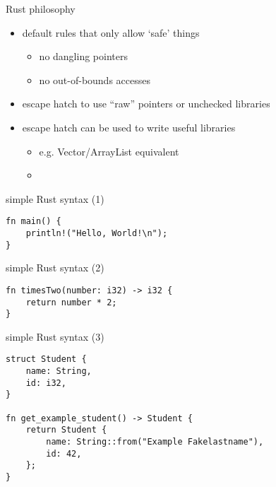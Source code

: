 \begin{frame}{Rust philosophy}
    \begin{itemize}
    \item default rules that only allow `safe' things
        \begin{itemize}
        \item no dangling pointers
        \item no out-of-bounds accesses
        \end{itemize}
    \item escape hatch to use ``raw'' pointers or unchecked libraries
    \item escape hatch can be used to write useful libraries
        \begin{itemize}
            \item e.g. Vector/ArrayList equivalent
            \item {}
        \end{itemize}
    \end{itemize}
\end{frame}

\begin{frame}[fragile,label=rustHelloWorld1]{simple Rust syntax (1)}
\begin{verbatim}
fn main() {
    println!("Hello, World!\n");
}
\end{verbatim}
\end{frame}

\begin{frame}[fragile,label=rustHelloWorld2]{simple Rust syntax (2)}
    \begin{verbatim}
fn timesTwo(number: i32) -> i32 {
    return number * 2;
}
\end{verbatim}
\end{frame}

\begin{frame}[fragile,label=rustHelloWorld3]{simple Rust syntax (3)}
    \begin{verbatim}
struct Student {
    name: String,
    id: i32,
}

fn get_example_student() -> Student {
    return Student {
        name: String::from("Example Fakelastname"),
        id: 42,
    };
}
\end{verbatim}
\end{frame}

